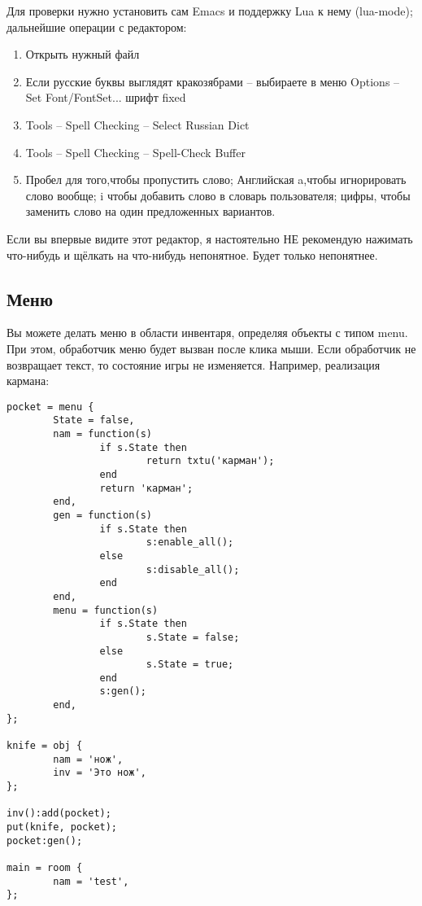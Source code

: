 \documentclass[a4paper,12pt]{article}
\begin{document}
Для проверки нужно установить сам Emacs и поддержку Lua к нему (lua-mode); дальнейшие операции с редактором:

\begin{enumerate}
\item Открыть нужный файл
\item Если русские буквы выглядят кракозябрами -- выбираете в меню Options -- Set Font/FontSet... шрифт fixed
\item Tools -- Spell Checking -- Select Russian Dict
\item Tools -- Spell Checking -- Spell-Check Buffer
\item Пробел для того,чтобы пропустить слово; Английская a,чтобы игнорировать слово вообще; i чтобы добавить слово в словарь пользователя; цифры, чтобы заменить слово на один предложенных вариантов.
\end{enumerate}

Если вы впервые видите этот редактор, я настоятельно НЕ рекомендую нажимать что-нибудь и щёлкать на что-нибудь непонятное. Будет только непонятнее.

\subsection{Меню}
Вы можете делать меню в области инвентаря, определяя объекты с типом menu. При этом, обработчик меню будет вызван после клика мыши. Если обработчик не возвращает текст, то состояние игры не изменяется. Например, реализация кармана:

\begin{verbatim}
pocket = menu {
        State = false,
        nam = function(s)
                if s.State then
                        return txtu('карман');
                end 
                return 'карман';
        end,
        gen = function(s)
                if s.State then
                        s:enable_all();
                else
                        s:disable_all();
                end 
        end,
        menu = function(s)
                if s.State then
                        s.State = false;
                else
                        s.State = true;
                end 
                s:gen();
        end,
};

knife = obj {
        nam = 'нож',
        inv = 'Это нож',
};

inv():add(pocket);
put(knife, pocket);
pocket:gen();

main = room {
        nam = 'test',
};
\end{verbatim}
\end{document}
